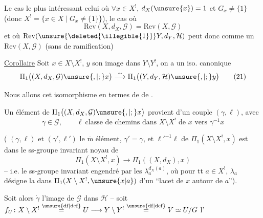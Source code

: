 
Le cas le plus intéressant 
celui où  $\forall x\in X^{!}$, 
$d_X(\unsure{x})=1$ et $G_x\ne\{1\}$
(donc $X^{!}=\{x\in X\mid G_x\ne\{1\}\}$),  le cas où
\[
\mathrm{Rev}(X,d_X,\mathcal G)=\mathrm{Rev}(X,\mathcal G) \tag{20}
\]
et où $\mathrm{Rev}(\unsure{\deleted{\illegible{1}}}Y,d_Y,\mathcal H)$ peut donc
 comme un $\mathrm{Rev}(X,\mathcal G)$
(sans  de ramification)



\uline{Corollaire} Soit $x\in X\setminus X^{!}$, $y$ son image dans
$Y\setminus Y^{!}$, on a un iso. canonique
\[
\Pi_1\bigl((X,d_X,\mathcal G)\unsure{,|;}x\bigr)
\overset{\sim}{\longrightarrow}
\Pi_1\bigl((Y,d_Y,\mathcal H)\unsure{,|;}y\bigr) \tag{21}
\]

Nous allons  cet isomorphisme en termes de
 de .

Un élément\inserted{$\alpha$} de
$\Pi_1\bigl((X,d_X,\mathcal G)\unsure{,|;}x\bigr)$
provient d'un couple $(\gamma,\ell)$, avec
\[
\gamma\in\mathcal G,\qquad
\ell\ \text{classe de chemins dans }X\setminus X^{!}
\text{ de }x\text{ vers }\gamma^{-1}x
\]

( $(\gamma,\ell)$ et $(\gamma',\ell')$  le
$\overline{\mathrm m}$ élément,  $\gamma'=\gamma$, et
 $\ell'^{-1}\ell$ de $\Pi_1(X\setminus X^{!},x)$ est
dans le ss-groupe invariant noyau de
\[
\Pi_1(X\setminus X^{!},x)\longrightarrow\Pi_1((X,d_X),x)
\]
-- i.e. le ss-groupe invariant engendré par les
 $\lambda_a^{d_X(a)}$, où
pour tt $a\in X^{!}$, $\lambda_a$ désigne la  dans
$\Pi_1(X\setminus X^{!},\unsure{x|a})$ d'un ``lacet de $x$ autour de $a$'').

Soit alors $\dot\gamma$ l'image de $\mathcal G$ dans $\mathcal H$ --
 soit
$f_U\colon X\setminus X^{!}\overset{\unsure{\mathrm{df}|\mathrm{def}}}{=}U
\longrightarrow Y\setminus Y^{!}\overset{\unsure{\mathrm{df}|\mathrm{def}}}{=}V
\simeq U/G$ l'

